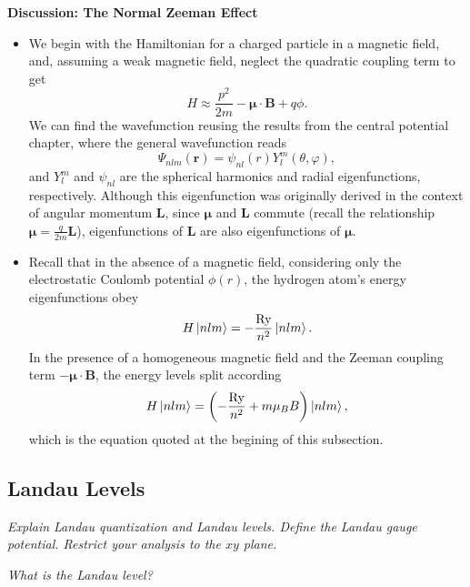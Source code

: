 \documentclass[11pt, a4paper]{article}
\renewcommand{\vec}[1]{\bm{#1}}  %
\renewcommand{\r}{\vec{r}}  %
\renewcommand{\L}{\vec{L}}  %
\newcommand{\B}{\vec{B}}  %
\newcommand{\m}{\vec{\mu}}  %
\newcommand{\p}{\psi}  %
\renewcommand{\P}{\Psi}  %
\begin{document}
\textbf{Discussion: The Normal Zeeman Effect}
\begin{itemize}

    \item We begin with the Hamiltonian for a charged particle in a magnetic field, and, assuming a weak magnetic field, neglect the quadratic coupling term to get
	\begin{equation*}
		H \approx \frac{p^{2}}{2m} - \m \cdot \B + q \phi.
	\end{equation*}
	We can find the wavefunction reusing the results from the central potential chapter, where the general wavefunction reads
	\begin{equation*}
		\P_{nlm}(\r) = \p_{nl}(r) Y_{l}^{m}(\theta, \varphi),
	\end{equation*}
	and $ Y_{l}^{m} $ and $ \p_{nl} $ are the spherical harmonics and radial eigenfunctions, respectively. Although this eigenfunction was originally derived in the context of angular momentum $ \vec{L} $, since $ \m $ and $ \L $ commute (recall the relationship $ \m = \frac{q}{2m}\L $), eigenfunctions of $ \L $ are also eigenfunctions of $ \m $. 
	
	\item Recall that in the absence of a magnetic field, considering only the electrostatic Coulomb potential $ \phi(r) $, the hydrogen atom's energy eigenfunctions obey
	\begin{equation*}
		H \ket{nlm} = - \frac{\si{Ry}}{n^{2}}\ket{nlm}.
	\end{equation*}
	In the presence of a homogeneous magnetic field and the Zeeman coupling term $ - \m \cdot \B $, the energy levels split according
	\begin{equation*}
		H \ket{nlm} = \left(- \frac{\si{Ry}}{n^{2}} + m \mu_{B}B\right)\ket{nlm},
	\end{equation*}
    which is the equation quoted at the begining of this subsection.
	
\end{itemize}


\subsection{Landau Levels}
\textit{Explain Landau quantization and Landau levels. Define the Landau gauge potential. Restrict your analysis to the $ xy $ plane.}

\textit{What is the Landau level?}
\end{document}
